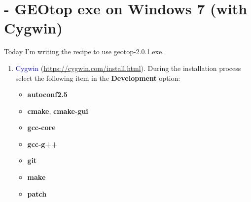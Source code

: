 \section{ - GEOtop exe on Windows 7 (with Cygwin)}\label{sec:20150817}

Today I'm writing the recipe to use geotop-2.0.1.exe.

\begin{enumerate}
\item \textcolor{blue}{Cygwin} (\url{https://cygwin.com/install.html}). During the installation process select the following item in the \textbf{Development} option:
  \begin{itemize}
  \item \textbf{autoconf2.5}
  \item \textbf{cmake}, \textbf{cmake-gui}
  \item \textbf{gcc-core}
  \item \textbf{gcc-g++}
  \item \textbf{git}
  \item \textbf{make}
  \item \textbf{patch}
  \end{itemize}
\end{enumerate}




